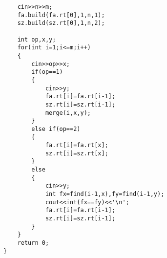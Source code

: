 \begin{verbatim}
    cin>>n>>m;
    fa.build(fa.rt[0],1,n,1);
    sz.build(sz.rt[0],1,n,2);

    int op,x,y;
    for(int i=1;i<=m;i++) 
    {
        cin>>op>>x;
        if(op==1)
        {
            cin>>y;
            fa.rt[i]=fa.rt[i-1];
            sz.rt[i]=sz.rt[i-1];
            merge(i,x,y);
        }
        else if(op==2)
        {
            fa.rt[i]=fa.rt[x];
            sz.rt[i]=sz.rt[x];
        }
        else 
        {
            cin>>y;
            int fx=find(i-1,x),fy=find(i-1,y);
            cout<<int(fx==fy)<<'\n';
            fa.rt[i]=fa.rt[i-1];
            sz.rt[i]=sz.rt[i-1];
        }
    }
    return 0;
}
\end{verbatim}

